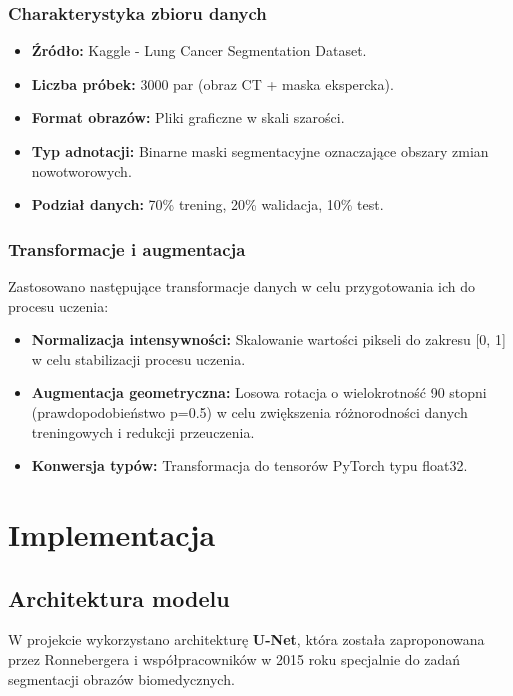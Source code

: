\documentclass[12pt,a4paper]{article}
\begin{document}
\subsubsection{Charakterystyka zbioru danych}
\begin{itemize}
    \item \textbf{Źródło:} Kaggle - Lung Cancer Segmentation Dataset.
    \item \textbf{Liczba próbek:} 3000 par (obraz CT + maska ekspercka).
    \item \textbf{Format obrazów:} Pliki graficzne w skali szarości.
    \item \textbf{Typ adnotacji:} Binarne maski segmentacyjne oznaczające obszary zmian nowotworowych.
    \item \textbf{Podział danych:} 70\% trening, 20\% walidacja, 10\% test.
\end{itemize}

\subsubsection{Transformacje i augmentacja}
Zastosowano następujące transformacje danych w celu przygotowania ich do procesu uczenia:
\begin{itemize}
    \item \textbf{Normalizacja intensywności:} Skalowanie wartości pikseli do zakresu [0, 1] w celu stabilizacji procesu uczenia.
    \item \textbf{Augmentacja geometryczna:} Losowa rotacja o wielokrotność 90 stopni (prawdopodobieństwo p=0.5) w celu zwiększenia różnorodności danych treningowych i redukcji przeuczenia.
    \item \textbf{Konwersja typów:} Transformacja do tensorów PyTorch typu float32.
\end{itemize}

\newpage

\section{Implementacja}

\subsection{Architektura modelu}
W projekcie wykorzystano architekturę \textbf{U-Net}, która została zaproponowana przez Ronnebergera i współpracowników w 2015 roku specjalnie do zadań segmentacji obrazów biomedycznych.
\end{document}
